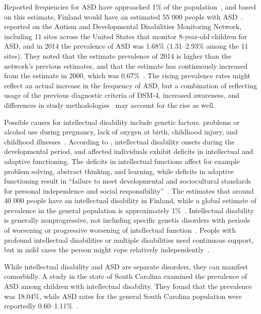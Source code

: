 \documentclass[utf8,english]{gradu3}
\begin{document}
Reported frequencies for ASD have approached 1\% of the population~\parencite{dsm5},
and based on this estimate, Finland would have an estimated 55 000 people with ASD~\parencite{autismiliitto}.
\textcite{baio2018} reported on the Autism and Developmental Disabilities Monitoring Network,
including 11 sites across the United States that monitor 8-year-old children for ASD,
and in 2014 the prevalence of ASD was 1.68\% (1.31--2.93\% among the 11 sites).
They noted that the estimate prevalence of 2014 is higher than the network's previous estimates,
and that the estimate has continuously increased from the estimate in 2000, which was 0.67\%~\parencite{baio2018}.
The rising prevalence rates might reflect an actual increase in the frequency of ASD, but a combination
of reflecting usage of the previous diagnostic criteria of DSM-4, increased awareness,
and differences in study methodologies~\parencite{dsm5}
may account for the rise as well.

Possible causes for intellectual disability include genetic factors, problems or alcohol use during pregnancy,
lack of oxygen at birth, childhood injury, and childhood illnesses~\parencite{kehitysvammaliittoID}.
According to \textcite{dsm5}, intellectual disability onsets during the developmental period,
and affected individuals exhibit deficits in intellectual and adaptive functioning.
The deficits in intellectual functions affect for example problem solving, abstract thinking, and learning,
while deficits in adaptive functioning result in ``failure to meet developmental and sociocultural standards
for personal independence and social responsibility''~\parencite{dsm5}.
The \textcite{kehitysvammaliittoID} estimates that around 40 000 people have an intellectual disability in Finland,
while a global estimate of prevalence in the general population is approximately 1\%~\parencite{dsm5}.
Intellectual disability is generally nonprogressive, not including specific genetic disorders with
periods of worsening or progressive worsening of intellectual function~\parencite{dsm5}.
People with profound intellectual disabilities or multiple disabilities need continuous support,
but in mild cases the person might cope relatively independently~\parencite{kehitysvammaliittoID}.

While intellectual disability and ASD are separate disorders, they can manifest comorbidly.
A study in the state of South Carolina examined the prevalence of ASD among children with intellectual disability.
They found that the prevalence was 18.04\%, while ASD rates for the general South Carolina
population were reportedly 0.60--1.11\%~\parencite{tonnsen2016}.
\end{document}
